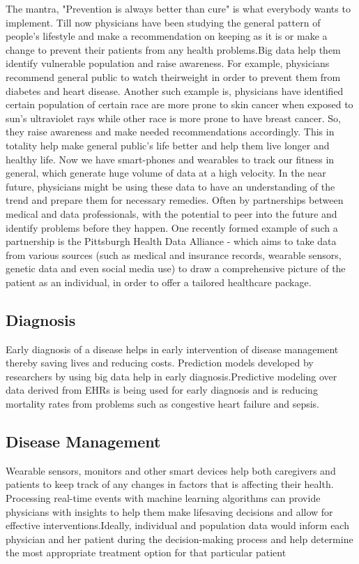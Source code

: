 \documentclass[sigconf]{acmart}
\begin{document}
The mantra, "Prevention is always better than cure" is what everybody
wants to implement. Till now physicians have been studying the general pattern of people's lifestyle and make a 
recommendation on keeping as it is or make a change to prevent their patients from any health problems.Big data help 
them identify vulnerable population and raise awareness. For example, physicians recommend general public to watch theirweight 
in order to prevent them from diabetes and heart disease. Another such example is, physicians have identified certain population 
of certain race are more prone to skin cancer when exposed to sun's ultraviolet rays while other race is more prone to have
breast cancer. So, they raise awareness and make needed recommendations accordingly. 
This in totality help make general public's life better and help them live longer and healthy life. Now we have smart-phones 
and wearables to track our fitness in general, which generate huge volume of data at a high velocity. In the near future, 
physicians might be using these data to have an understanding of the trend and prepare them for necessary remedies. 
Often by partnerships between medical and data professionals, with the potential to peer into the future and identify problems 
before they happen\cite{www-forbes-com}. One recently formed example of such a partnership is the Pittsburgh Health Data 
Alliance - which aims to take data from various sources (such as medical and insurance records, wearable sensors, genetic data and 
even social media use) to draw a comprehensive picture of the patient as an individual, in order to offer a tailored 
healthcare package\cite{www-forbes-com}.   

 

\subsection{Diagnosis}
Early diagnosis of a disease helps in early intervention of disease management thereby saving lives and 
reducing costs. Prediction models developed by researchers by using big data help in early diagnosis.Predictive modeling over
data derived from EHRs is being used for early diagnosis and is reducing mortality rates from problems such as congestive heart 
failure and sepsis\cite{www-mapr-com}.


\subsection{Disease Management} 
Wearable sensors, monitors and other smart devices help both caregivers and patients to keep track of any changes in factors that
is affecting their health. Processing real-time events with machine learning algorithms can provide physicians with insights to
help them make lifesaving decisions and allow for effective interventions\cite{www-mapr-com}.Ideally, individual and population
data would inform each physician and her patient during the decision-making process and help determine the most appropriate 
treatment option for that particular patient\cite{www-link-springer-com}
\end{document}
